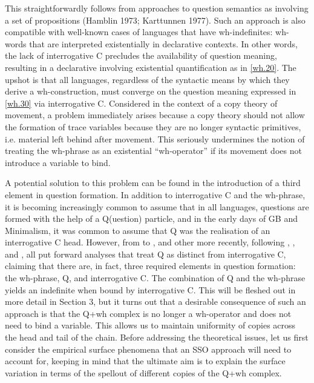 \documentclass{glossa}
\begin{document}
This straightforwardly follows from approaches to question semantics as involving a set of propositions (Hamblin 1973; Karttunnen 1977). Such an approach is also compatible with well-known cases of languages that have wh-indefinites: wh-words that are interpreted existentially in declarative contexts. In other words, the lack of interrogative C precludes the availability of question meaning, resulting in a declarative involving existential quantification as in \ref{wh.20}. The upshot is that all languages, regardless of the syntactic means by which they derive a wh-construction, must converge on the question meaning expressed in \ref{wh.30} via interrogative C. Considered in the context of a copy theory of movement, a problem immediately arises because a copy theory should not allow the formation of trace variables because they are no longer syntactic primitives, i.e. material left behind after movement. This seriously undermines the notion of treating the wh-phrase as an existential ``wh-operator'' if its movement does not introduce a variable to bind.

A potential solution to this problem can be found in the introduction of a third element in question formation. In addition to interrogative C and the wh-phrase, it is becoming increasingly common to assume that in all languages, questions are formed with the help of a Q(uestion) particle, and in the early days of GB and Minimalism, it was common to assume that Q was the realisation of an interrogative C head. However, from \cite{watanabe:1992} to \cite{hagstrom:1998}, and other more recently, following \cite{cable:2007}, \cite{yeo:2010}, \cite{slade:2011} and \cite{chernova:2014}, all put forward analyses that treat Q as distinct from interrogative C, claiming that there are, in fact, three required elements in question formation: the wh-phrase, Q, and interrogative C. The combination of Q and the wh-phrase yields an indefinite when bound by interrogative C. This will be fleshed out in more detail in Section 3, but it turns out that a desirable consequence of such an approach is that the Q+wh complex is no longer a wh-operator and does not need to bind a variable. This allows us to maintain uniformity of copies across the head and tail of the chain. Before addressing the theoretical issues, let us first consider the empirical surface phenomena that an SSO approach will need to account for, keeping in mind that the ultimate aim is to explain the surface variation in terms of the spellout of different copies of the Q+wh complex.
\end{document}
